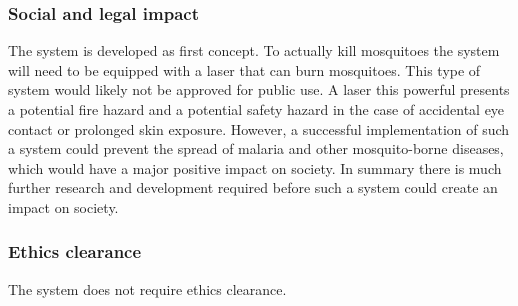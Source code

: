 \subsubsection{Social and legal impact}
The system is developed as first concept. To actually kill mosquitoes the system will need to be equipped with a laser that can burn mosquitoes. This type of system would likely not be approved for public use. A laser this powerful presents a potential fire hazard and a potential safety hazard in the case of accidental eye contact or prolonged skin exposure. However, a successful implementation of such a system could prevent the spread of malaria and other mosquito-borne diseases, which would have a major positive impact on society. In summary there is much further research and development required before such a system could create an impact on society.

\subsubsection{Ethics clearance}
The system does not require ethics clearance.

\newpage



